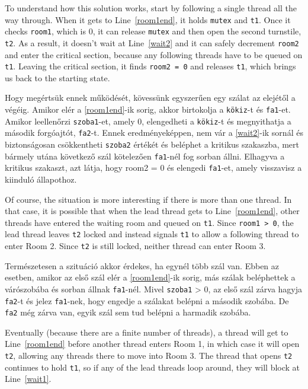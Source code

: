 \documentclass{book}
\begin{document}
To understand how this solution works, start by following a single
thread all the way through.  When it gets to Line~\ref{room1end}, it
holds {\tt mutex} and {\tt t1}.  Once it checks {\tt room1}, which is
0, it can release {\tt mutex} and then open the second turnstile, {\tt
t2}.  As a result, it doesn't wait at Line~\ref{wait2} and it can
safely decrement {\tt room2} and enter the critical section, because
any following threads have to be queued on {\tt t1}.  Leaving the
critical section, it finds {\tt room2 = 0} and releases {\tt t1},
which brings us back to the starting state.

Hogy megértsük ennek működését, kövessünk egyszerűen egy szálat az elejétől a végéig.
Amikor elér a \ref{room1end}-ik sorig, akkor birtokolja a {\tt kökiz}-t és {\tt fa1}-et.
Amikor leellenőrzi {\tt szoba1}-et, amely 0, elengedheti a {\tt kökiz}-t és
megnyithatja a második forgóajtót, {\tt fa2}-t. Ennek eredményeképpen, nem vár a \ref{wait2}-ik sornál
és biztonságosan csökkentheti {\tt szoba2} értékét és beléphet a kritikus szakaszba,
mert bármely utána következő szál kötelezően {\tt fa1}-nél fog sorban állni.
Elhagyva a kritikus szakaszt, azt látja, hogy room2 = 0 és elengedi {\tt fa1}-et,
amely visszavisz a kiinduló állapothoz. 

Of course, the situation is more interesting if there is more than one
thread.  In that case, it is possible that when the lead thread gets
to Line~\ref{room1end}, other threads have entered the waiting room
and queued on {\tt t1}.  Since {\tt room1 > 0}, the lead thread leaves
{\tt t2} locked and instead signals {\tt t1} to allow a following
thread to enter Room 2.  Since {\tt t2} is still locked, neither
thread can enter Room 3.

Természetesen a szituáció akkor érdekes, ha egynél több szál van. Ebben az esetben,
amikor az első szál elér a \ref{room1end}-ik sorig, más szálak beléphettek a várószobába és
sorban állnak {\tt fa1}-nél. Mivel {\tt szoba1} > 0, az első szál zárva hagyja {\tt fa2}-t és jelez
{\tt fa1}-nek, hogy engedje a szálakat belépni a második szobába. De {\tt fa2} még zárva van,
egyik szál sem tud belépni a harmadik szobába.

Eventually (because there are a finite number of threads), a thread
will get to Line~\ref{room1end} before another thread enters Room 1, in which
case it will open {\tt t2}, allowing any threads there to move into
Room 3.  The thread that opens {\tt t2} continues to hold {\tt t1}, so
if any of the lead threads loop around, they will block at Line~\ref{wait1}.
\end{document}
